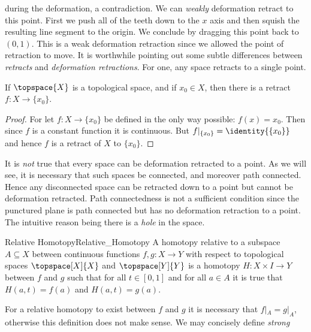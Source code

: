         during the deformation, a contradiction. We can
        \textit{weakly} deformation retract to this point. First we push
        all of the teeth down to the $x$ axis and then squish the
        resulting line segment to the origin. We conclude by dragging
        this point back to $(0,1)$. This is a weak deformation
        retraction since we allowed the point of retraction to move.
        It is worthwhile pointing out some subtle differences between
        \textit{retracts} and \textit{deformation retractions}. For one,
        any space retracts to a single point.
        \begin{theorem}
            If $\topspace{X}$ is a topological space, and if
            $x_{0}\in{X}$, then there is a retract
            $f:X\rightarrow\{x_{0}\}$.
        \end{theorem}
        \begin{proof}
            For let $f:X\rightarrow\{x_{0}\}$ be defined in the only way
            possible: $f(x)=x_{0}$. Then since $f$ is a constant
            function it is continuous. But
            $f|_{\{x_{0}\}}=\identity{\{x_{0}\}}$ and hence $f$ is a
            retract of $X$ to $\{x_{0}\}$.
        \end{proof}
        It is \textit{not} true that every space can be deformation
        retracted to a point. As we will see, it is necessary that
        such spaces be connected, and moreover path connected. Hence any
        disconnected space can be retracted down to a point but cannot
        be deformation retracted. Path connectedness is not a sufficient
        condition since the punctured plane is path connected but has
        no deformation retraction to a point. The intuitive reason
        being there is a \textit{hole} in the space.
        \begin{fdefinition}{Relative Homotopy}{Relative_Homotopy}
            A homotopy relative to a subspace $A\subseteq{X}$ between
            continuous functions $f,g:X\rightarrow{Y}$ with respect to
            topological spaces $\topspace[X]{X}$ and $\topspace[Y]{Y}$
            is a homotopy $H:X\times{I}\rightarrow{Y}$ between $f$ and
            $g$ such that for all $t\in[0,1]$ and for all $a\in{A}$ it
            is true that $H(a,t)=f(a)$ and $H(a,t)=g(a)$.
        \end{fdefinition}
        For a relative homotopy to exist between $f$ and $g$ it is
        necessary that $f|_{A}=g|_{A}$, otherwise this definition does
        not make sense. We may concisely define \textit{strong}
